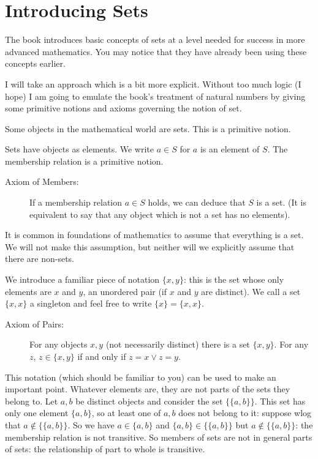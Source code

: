 \documentclass[12pt]{article}
\begin{document}
\newpage

\section{Introducing Sets}

The book introduces basic concepts of sets at a level needed for success in more advanced mathematics.  You may notice that they have already been using these concepts earlier.

I will take an approach which is a bit more explicit.   Without too much logic (I hope) I am going to emulate the book's treatment of natural numbers by giving some primitive notions and axioms governing the notion of set.

Some objects in the mathematical world are sets.  This is a primitive notion.

Sets have objects as elements.  We write $a \in S$ for $a$ is an element of $S$.  The membership relation is a primitive notion.

\begin{description}

\item[Axiom of Members:]  If a membership relation $a \in S$ holds, we can deduce that $S$ is a set.  (It is equivalent to say that any object which is not a set has no elements).

\end{description}

It is common in foundations of mathematics to assume that everything is a set.  We will not make this assumption, but neither will we explicitly assume that there are non-sets.

We introduce a familiar piece of notation $\{x,y\}$:  this is the set whose only elements are $x$ and $y$, an unordered pair (if $x$ and $y$ are distinct).  We call a set $\{x,x\}$ a singleton and feel free to write $\{x\} = \{x,x\}$.

\begin{description}

\item[Axiom of Pairs:]  For any objects $x,y$ (not necessarily distinct) there is a set $\{x,y\}$.  For any $z$, $z \in \{x,y\}$ if and only if $z=x \vee z=y$.

\end{description}

This notation (which should be familiar to you) can be used to make an important point.  Whatever elements are, they are not parts of the sets they belong to.  Let $a,b$ be distinct objects and consider the set $\{\{a,b\}\}$.  This set has only one element $\{a,b\}$, so at least one of $a,b$ does not belong to it:  suppose wlog that $a \not\in \{\{a,b\}\}$.  So we have $a \in \{a,b\}$ and $\{a,b\} \in \{\{a,b\}\}$ but $a \not\in \{\{a,b\}\}$:  the membership relation is not transitive.  So members of sets are not in general parts of sets:  the relationship of part to whole is transitive.
\end{document}
